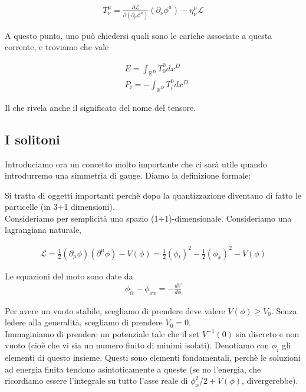 \documentclass{report}
\begin{document}
{    \begin{align}
        T^\mu_\nu = \frac{\partial \mathcal{L}}{\partial (\partial_\mu \phi^a)}(\partial_\nu \phi^a) - \eta^\mu_\nu\mathcal{L}
    \end{align}
    
    A questo punto, uno può chiedersi quali sono le cariche associate a questa corrente, e troviamo che vale

    \begin{align}
        &E = \int_{\mathbb{R}^D}T^0_0 dx^D \\
        &P_i = -\int_{\mathbb{R}^D}T^0_i dx^D 
    \end{align}

    Il che rivela anche il significato del nome del tensore. 
}


\subsection{I solitoni}

Introduciamo ora un concetto molto importante che ci sarà utile quando introdurremo una simmetria di gauge. Diamo la definizione formale: 


Si tratta di oggetti importanti perchè dopo la quantizzazione diventano di fatto le particelle (in 3+1 dimensioni). \\
Consideriamo per semplicità uno spazio (1+1)-dimensionale. Consideriamo una lagrangiana naturale, 

\begin{align}
    \mathcal{L} = \frac{1}{2}(\partial_\mu \phi)(\partial^\mu \phi) - V(\phi) = \frac{1}{2}(\phi_t)^2 - \frac{1}{2}(\phi_x)^2 - V(\phi)
\end{align}

Le equazioni del moto sono date da 
\begin{align}
    \phi_{tt} - \phi_{xx} = -\frac{dV}{d\phi}
\end{align}

Per avere un vuoto stabile, scegliamo di prendere deve valere \(V(\phi) \geq V_0\). Senza ledere alla generalità, scegliamo di prendere \(V_0 =0\). \\

Immaginiamo di prendere un potenziale tale che il set \(V^{-1}(0)\) sia discreto e non vuoto (cioè che vi sia un numero finito di minimi isolati). Denotiamo con \(\phi_i\) gli elementi di questo insieme. Questi sono elementi fondamentali, perchè le soluzioni ad energia finita tendono asintoticamente a queste (se no l'energia, che ricordiamo essere l'integrale su tutto l'asse reale di \(\phi_x^2/2 + V(\phi)\), divergerebbe). \\
\end{document}
